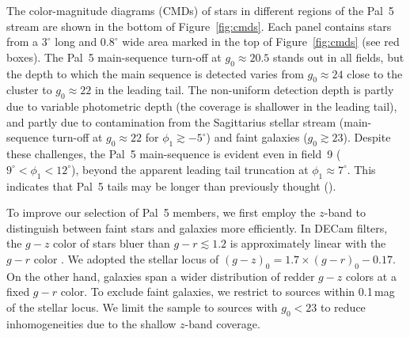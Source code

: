 \documentclass[twocolumn]{aastex62}
\begin{document}
The color-magnitude diagrams (CMDs) of stars in different regions of the Pal~5 stream are shown in the bottom of Figure~\ref{fig:cmds}.
Each panel contains stars from a $3^\circ$ long and $0.8^\circ$ wide area marked in the top of Figure~\ref{fig:cmds} (see red boxes).
The Pal~5 main-sequence turn-off at $g_0\approx20.5$ stands out in all fields, but the depth to which the main sequence is detected varies from $g_0\approx24$ close to the cluster to $g_0\approx22$ in the leading tail.
The non-uniform detection depth is partly due to variable photometric depth (the coverage is shallower in the leading tail), and partly due to contamination from the Sagittarius stellar stream (main-sequence turn-off at $g_0\approx22$ for $\phi_1\gtrsim-5^\circ$) and faint galaxies ($g_0\gtrsim23$).
Despite these challenges, the Pal~5 main-sequence is evident even in field~9 ($9^\circ<\phi_1<12^\circ$), beyond the apparent leading tail truncation at $\phi_1\approx7^\circ$.
This indicates that Pal~5 tails may be longer than previously thought (\citealt{Bernard:2016}).

To improve our selection of Pal~5 members, we first employ the $z$-band to distinguish between faint stars and galaxies more efficiently.
In DECam filters, the $g-z$ color of stars bluer than $g-r\lesssim1.2$ is approximately linear with the $g-r$ color \citep[e.g.,][]{dey2019}.
We adopted the stellar locus of $(g-z)_0 = 1.7\times(g-r)_0 -0.17$.
On the other hand, galaxies span a wider distribution of redder $g-z$ colors at a fixed $g-r$ color.
To exclude faint galaxies, we restrict to sources within 0.1\,mag of the stellar locus.
We limit the sample to sources with $g_0<23$ to reduce inhomogeneities due to the shallow $z$-band coverage.
\end{document}
